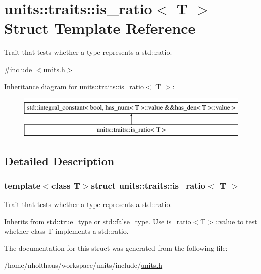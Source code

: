 \hypertarget{structunits_1_1traits_1_1is__ratio}{}\section{units\+:\+:traits\+:\+:is\+\_\+ratio$<$ T $>$ Struct Template Reference}
\label{structunits_1_1traits_1_1is__ratio}


Trait that tests whether a type represents a std\+::ratio.  




{\ttfamily \#include $<$units.\+h$>$}

Inheritance diagram for units\+:\+:traits\+:\+:is\+\_\+ratio$<$ T $>$\+:\begin{figure}[H]
\begin{center}
\leavevmode
\includegraphics[height=2.000000cm]{structunits_1_1traits_1_1is__ratio}
\end{center}
\end{figure}


\subsection{Detailed Description}
\subsubsection*{template$<$class T$>$struct units\+::traits\+::is\+\_\+ratio$<$ T $>$}

Trait that tests whether a type represents a std\+::ratio. 

Inherits from {\ttfamily std\+::true\+\_\+type} or {\ttfamily std\+::false\+\_\+type}. Use {\ttfamily \hyperlink{structunits_1_1traits_1_1is__ratio}{is\+\_\+ratio}$<$T$>$\+::value} to test whether {\ttfamily class T} implements a std\+::ratio. 

The documentation for this struct was generated from the following file\+:\begin{DoxyCompactItemize}
\item 
/home/nholthaus/workspace/units/include/\hyperlink{units_8h}{units.\+h}\end{DoxyCompactItemize}
